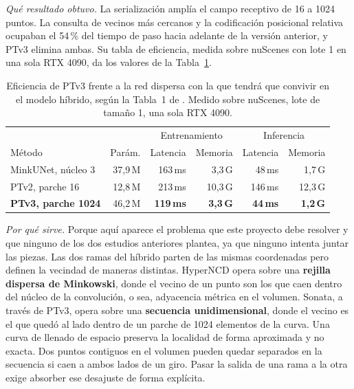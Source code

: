 \emph{Qué resultado obtuvo.} La serialización amplía el campo receptivo de 16 a
1024 puntos. La consulta de vecinos más cercanos y la codificación posicional
relativa ocupaban el 54\,\% del tiempo de paso hacia adelante de la versión
anterior, y PTv3 elimina ambas. Su tabla de eficiencia, medida sobre nuScenes con
lote 1 en una sola RTX 4090, da los valores de la
Tabla~\ref{tab:eficiencia-ptv3}.

\begin{table}[!htbp]
\centering
{}\small
\caption[Eficiencia de PTv3 frente a la red dispersa]{Eficiencia de PTv3 frente a la red dispersa con la que tendrá que
convivir en el modelo híbrido, según la Tabla~1 de \cite{wu2024ptv3}. Medido
sobre nuScenes, lote de tamaño 1, una sola RTX 4090.}
\label{tab:eficiencia-ptv3}
\begin{tabularx}{\linewidth}{@{}>{\raggedright\arraybackslash\hsize=1.00\hsize}Xrrrrr@{}}
\hline
 & & \multicolumn{2}{c}{Entrenamiento} & \multicolumn{2}{c}{Inferencia} \\
Método & Parám. & Latencia & Memoria & Latencia & Memoria \\
\hline
MinkUNet, núcleo 3 & 37,9\,M & 163\,ms & 3,3\,G & 48\,ms & 1,7\,G \\
PTv2, parche 16 & 12,8\,M & 213\,ms & 10,3\,G & 146\,ms & 12,3\,G \\
\textbf{PTv3, parche 1024} & 46,2\,M & \textbf{119\,ms} & \textbf{3,3\,G} &
\textbf{44\,ms} & \textbf{1,2\,G} \\
\hline
\end{tabularx}
\end{table}

\emph{Por qué sirve.} Porque aquí aparece el problema que este proyecto debe
resolver y que ninguno de los dos estudios anteriores plantea, ya que ninguno
intenta juntar las piezas. Las dos ramas del híbrido parten de las mismas
coordenadas pero definen la vecindad de maneras distintas. HyperNCD opera sobre
una \textbf{rejilla dispersa de Minkowski}, donde el vecino de un punto son los
que caen dentro del núcleo de la convolución, o sea, adyacencia métrica en el volumen.
Sonata, a través de PTv3, opera sobre una \textbf{secuencia unidimensional},
donde el vecino es el que quedó al lado dentro de un parche de 1024 elementos de
la curva. Una curva de llenado de espacio preserva la localidad de forma
aproximada y no exacta. Dos puntos contiguos en el volumen pueden
quedar separados en la secuencia si caen a ambos lados de un giro. Pasar la
salida de una rama a la otra exige absorber ese desajuste de forma explícita.

